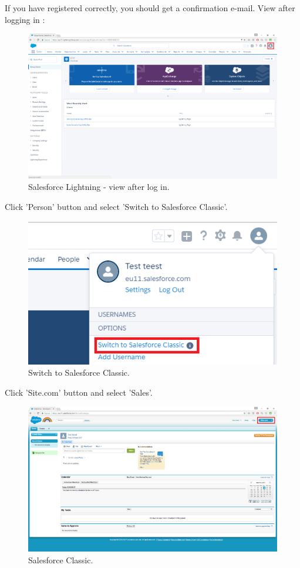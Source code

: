\documentclass[12pt,a4paper]{article}
\begin{document}
If you have registered correctly, you should get a confirmation e-mail.
View after logging in :
\begin{figure}[H]
	\centering
	\includegraphics[width = 1 \textwidth]{images/mains.PNG}
	\caption{Salesforce Lightning - view after log in.}
	\label{fig:logq}
\end{figure}
Click 'Person' button and select 'Switch to Salesforce Classic'.
\begin{figure}[H]
	\centering
	\includegraphics{images/change1.PNG}
	\caption{Switch to Salesforce Classic.}
	\label{fig:logw}
\end{figure}
Click 'Site.com' button and select 'Sales'.
\begin{figure}[H]
	\centering
	\includegraphics[width = 1 \textwidth]{images/change2.PNG}
	\caption{Salesforce Classic.}
	\label{fig:loge}
\end{figure}
\end{document}
